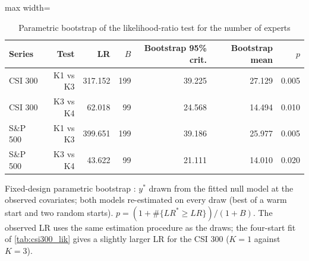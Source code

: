 \begin{table}[!htbp]\centering\small
\caption{Parametric bootstrap of the likelihood-ratio test for the number of experts}\label{tab:kg-boot}
\begin{adjustbox}{max width=\textwidth}
\begin{tabular}{lrrrrrr}
\toprule
Series & Test & LR & $B$ & Bootstrap 95\% crit. & Bootstrap mean & $p$\\
\midrule
CSI 300 & K1 vs K3 & 317.152 & 199 & 39.225 & 27.129 & 0.005\\
CSI 300 & K3 vs K4 & 62.018 & 99 & 24.568 & 14.494 & 0.010\\
S\&P 500 & K1 vs K3 & 399.651 & 199 & 39.186 & 25.977 & 0.005\\
S\&P 500 & K3 vs K4 & 43.622 & 99 & 21.111 & 14.010 & 0.020\\
\bottomrule
\end{tabular}
\end{adjustbox}
\par\smallskip\begin{minipage}{\textwidth}\footnotesize
Fixed-design parametric bootstrap \citep{mclachlan1987bootstrapping}: $y^\ast$ drawn from the fitted null model at the observed covariates; both models re-estimated on every draw (best of a warm start and two random starts). $p=(1+\#\{LR^\ast\ge LR\})/(1+B)$. The observed LR uses the same estimation procedure as the draws; the four-start fit of \cref{tab:csi300_lik} gives a slightly larger LR for the CSI 300 ($K=1$ against $K=3$).
\end{minipage}
\end{table}